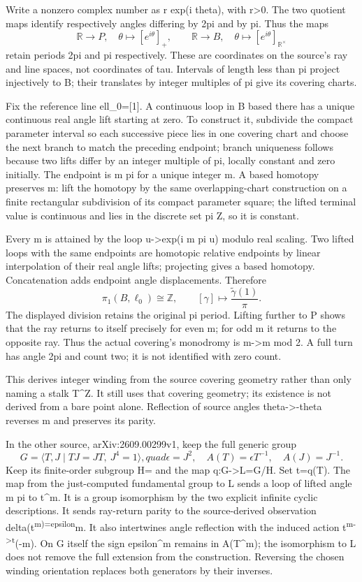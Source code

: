 \documentclass[
  11pt,
]{article}
\begin{document}
Write a nonzero complex number as r exp(i theta), with r\textgreater0.
The two quotient maps identify respectively angles differing by 2pi and
by pi. Thus the maps \[
\mathbb R\longrightarrow P,\quad\theta\longmapsto[e^{i\theta}]_+,
\qquad
\mathbb R\longrightarrow B,\quad\theta\longmapsto[e^{i\theta}]_{\mathbb R^\times}
\] retain periods 2pi and pi respectively. These are coordinates on the
source's ray and line spaces, not coordinates of tau. Intervals of
length less than pi project injectively to B; their translates by
integer multiples of pi give its covering charts.

Fix the reference line ell\_0={[}1{]}. A continuous loop in B based
there has a unique continuous real angle lift starting at zero. To
construct it, subdivide the compact parameter interval so each
successive piece lies in one covering chart and choose the next branch
to match the preceding endpoint; branch uniqueness follows because two
lifts differ by an integer multiple of pi, locally constant and zero
initially. The endpoint is m pi for a unique integer m. A based homotopy
preserves m: lift the homotopy by the same overlapping-chart
construction on a finite rectangular subdivision of its compact
parameter square; the lifted terminal value is continuous and lies in
the discrete set pi Z, so it is constant.

Every m is attained by the loop u-\textgreater exp(i m pi u) modulo real
scaling. Two lifted loops with the same endpoints are homotopic relative
endpoints by linear interpolation of their real angle lifts; projecting
gives a based homotopy. Concatenation adds endpoint angle displacements.
Therefore \[
\pi_1(B,\ell_0)\cong\mathbb Z,\qquad[\gamma]\longmapsto\frac{\widetilde\gamma(1)}{\pi}.
\] The displayed division retains the original pi period. Lifting
further to P shows that the ray returns to itself precisely for even m;
for odd m it returns to the opposite ray. Thus the actual covering's
monodromy is m-\textgreater m mod 2. A full turn has angle 2pi and count
two; it is not identified with zero count.

This derives integer winding from the source covering geometry rather
than only naming a stalk T\^{}Z. It still uses that covering geometry;
its existence is not derived from a bare point alone. Reflection of
source angles theta-\textgreater-theta reverses m and preserves its
parity.

In the other source, arXiv:2609.00299v1, keep the full generic group \[
G=\langle T,J\mid TJ=JT,\ J^4=1\rangle,quad\epsilon=J^2,
\quad A(T)=\epsilon T^{-1},\quad A(J)=J^{-1}.
\] Keep its finite-order subgroup H= and the map q:G-\textgreater L=G/H.
Set t=q(T). The map from the just-computed fundamental group to L sends
a loop of lifted angle m pi to t\^{}m. It is a group isomorphism by the
two explicit infinite cyclic descriptions. It sends ray-return parity to
the source-derived observation delta(t\textsuperscript{m)=epsilon}m. It
also intertwines angle reflection with the induced action
t\textsuperscript{m-\textgreater t}(-m). On G itself the sign
epsilon\^{}m remains in A(T\^{}m); the isomorphism to L does not remove
the full extension from the construction. Reversing the chosen winding
orientation replaces both generators by their inverses.
\end{document}
